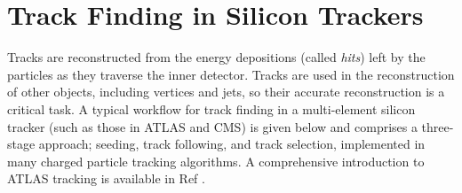 



\section{Track Finding in Silicon Trackers}
\label{track-finding-silicon-trackers}



Tracks are reconstructed from the energy depositions (called \textit{hits}) left by the particles as they traverse the inner detector. Tracks are used in the reconstruction of other objects, including vertices and jets, so their accurate reconstruction is a critical task. A typical workflow for track finding in a multi-element silicon tracker (such as those in ATLAS and CMS) is given below and comprises a three-stage approach; seeding, track following, and track selection, implemented in many charged particle tracking algorithms. A comprehensive introduction to ATLAS tracking is available in Ref \cite{Cornelissen:2007vba}.



